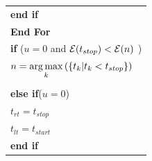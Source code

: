 \begin{table}
\begin{minipage}[b]{8cm}
\begin{tabular}{p{7cm}}
\hspace{7mm}\textbf{end if}
\\
\hspace{4mm}\textbf{End For}
\\
\hspace{4mm}\textbf{if} ($u=0$ and $\mathcal{E}(t_{stop}) < \mathcal{E}(n) $ )
\\
\hspace{7mm} $n=\displaystyle \operatorname*{arg\,max}_k\left(\left\{t_k | t_k< t_{stop} \right\}\right)$
\\
\\
\hspace{4mm}\textbf{else if}($u=0$)
\\
\hspace{7mm}$t_{rt} = t_{stop}$
\\
\hspace{7mm}$t_{lt} = t_{start}$
\\
\hspace{4mm}\textbf{end if}

\end{tabular}
\end{minipage}
\end{table}
